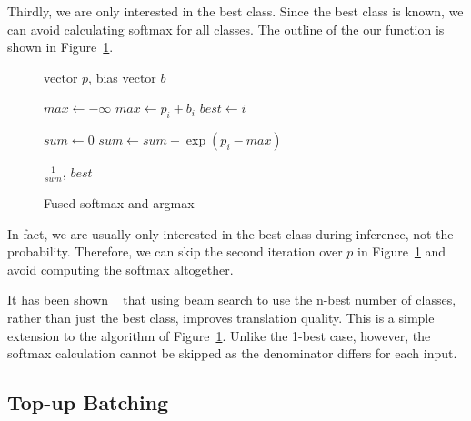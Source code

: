 \documentclass[11pt,a4paper]{article}
\begin{document}
Thirdly, we are only interested in the best class. Since the best class is known, we can avoid calculating softmax for all classes. The outline of the our function is shown in Figure~\ref{algo:Fused Kernel}.

\begin{figure} [h]
\begin{algorithmic}
\REQUIRE vector $p$, bias vector $b$


\STATE $max \gets - \infty$ 
    \STATE $max \gets p_i + b_i$
    \STATE $best \gets i$
  \ENDIF
\ENDFOR 


\STATE $sum \gets 0$ 
    \STATE $sum \gets sum + \exp(p_i - max)$
  \ENDIF
\ENDFOR 

\RETURN $\frac{1}{sum}$, $best$ 


\end{algorithmic}
\caption{Fused softmax and argmax}
\label{algo:Fused Kernel}
\end{figure}


In fact, we are usually only interested in the best class during inference, not the probability. Therefore, we can skip the second iteration over $p$ in Figure~\ref{algo:Fused Kernel} and avoid computing the softmax altogether. %

% 
% 
% 
% 

It has been shown ~\citep{koehn-knowles:2017:NMT} that using beam search to use the n-best number of classes, rather than just the best class, improves translation quality. This is a simple extension to the algorithm of Figure~\ref{algo:Fused Kernel}. Unlike the 1-best case, however, the softmax calculation cannot be skipped as the denominator differs for each input.


\subsection{Top-up Batching}
\end{document}
